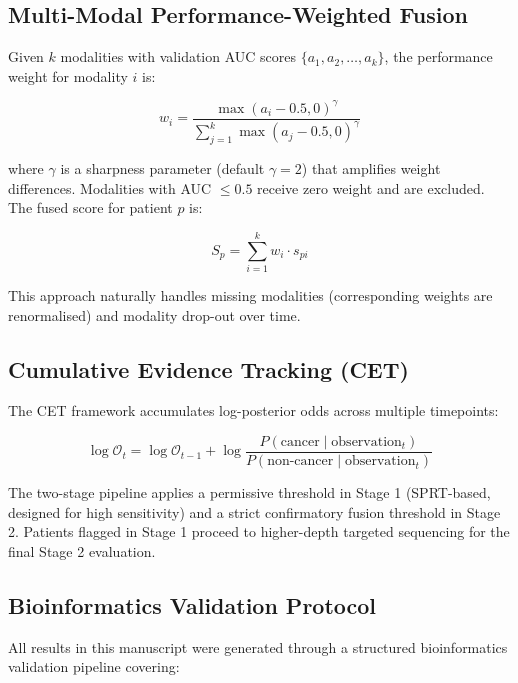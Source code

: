 \documentclass[11pt,a4paper]{article}
\begin{document}
\subsection{Multi-Modal Performance-Weighted Fusion}

Given $k$ modalities with validation AUC scores $\{a_1, a_2, \ldots, a_k\}$, the performance weight for modality $i$ is:

\begin{equation}
w_i = \frac{\max(a_i - 0.5, 0)^\gamma}{\sum_{j=1}^k \max(a_j - 0.5, 0)^\gamma}
\end{equation}

where $\gamma$ is a sharpness parameter (default $\gamma=2$) that amplifies weight differences. Modalities with AUC $\leq 0.5$ receive zero weight and are excluded. The fused score for patient $p$ is:

\begin{equation}
S_p = \sum_{i=1}^k w_i \cdot s_{pi}
\end{equation}

This approach naturally handles missing modalities (corresponding weights are renormalised) and modality drop-out over time.

\subsection{Cumulative Evidence Tracking (CET)}

The CET framework accumulates log-posterior odds across multiple timepoints:

\begin{equation}
\log\mathcal{O}_t = \log\mathcal{O}_{t-1} + \log\frac{P(\text{cancer} \mid \text{observation}_t)}{P(\text{non-cancer} \mid \text{observation}_t)}
\end{equation}

The two-stage pipeline applies a permissive threshold in Stage 1 (SPRT-based, designed for high sensitivity) and a strict confirmatory fusion threshold in Stage 2. Patients flagged in Stage 1 proceed to higher-depth targeted sequencing for the final Stage 2 evaluation.

\subsection{Bioinformatics Validation Protocol}

All results in this manuscript were generated through a structured bioinformatics validation pipeline covering:
\end{document}
